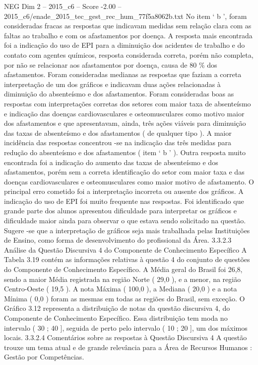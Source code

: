 \begin{textsample}{NEG Dim 2 – 2015\_c6 – Score -2.00 – 2015\_c6/enade\_2015\_tec\_gest\_rec\_hum\_77f5a8062b.txt}
No item ‘ b ’, foram consideradas fracas as respostas que indicavam medidas sem relação clara com as faltas ao trabalho e com os afastamentos por doença.
A resposta mais encontrada foi a indicação do uso de EPI para a diminuição dos acidentes de trabalho e do contato com agentes químicos, resposta considerada correta, porém não completa, por não se relacionar aos afastamentos por doença, causa de 80 \% dos afastamentos.
Foram consideradas medianas as respostas que faziam a correta interpretação de um dos gráficos e indicavam duas ações relacionadas à diminuição do absenteísmo e dos afastamentos.
Foram consideradas boas as respostas com interpretações corretas dos setores com maior taxa de absenteísmo e indicação das doenças cardiovasculares e osteomusculares como motivo maior dos afastamentos e que apresentavam, ainda, três ações viáveis para diminuição das taxas de absenteísmo e dos afastamentos ( de qualquer tipo ).
A maior incidência das respostas concentrou -se na indicação das três medidas para redução do absenteísmo e dos afastamentos ( item ‘ b ’ ).
Outra resposta muito encontrada foi a indicação do aumento das taxas de absenteísmo e dos afastamentos, porém sem a correta identificação do setor com maior taxa e das doenças cardiovasculares e osteomusculares como maior motivo de afastamento.
O principal erro cometido foi a interpretação incorreta ou ausente dos gráficos.
A indicação do uso de EPI foi muito frequente nas respostas.
Foi identificado que grande parte dos alunos apresentou dificuldade para interpretar os gráficos e dificuldade maior ainda para observar o que estava sendo solicitado na questão.
Sugere -se que a interpretação de gráficos seja mais trabalhada pelas Instituições de Ensino, como forma de desenvolvimento do profissional da Área. 3.3.2.3 Análise da Questão Discursiva 4 do Componente de Conhecimento Específico A Tabela 3.19 contém as informações relativas à questão 4 do conjunto de questões do Componente de Conhecimento Específico.
A Média geral do Brasil foi 26,8, sendo a maior Média registrada na região Norte ( 29,0 ), e a menor, na região Centro-Oeste ( 19,5 ).
A nota Máxima ( 100,0 ), a Mediana ( 20,0 ) e a nota Mínima ( 0,0 ) foram as mesmas em todas as regiões do Brasil, sem exceção.
O Gráfico 3.12 representa a distribuição de notas da questão discursiva 4, do Componente de Conhecimento Específico.
Essa distribuição tem moda no intervalo ( 30 ; 40 ], seguida de perto pelo intervalo ( 10 ; 20 ], um dos máximos locais. 3.3.2.4 Comentários sobre as respostas à Questão Discursiva 4 A questão trouxe um tema atual e de grande relevância para a Área de Recursos Humanos : Gestão por Competências.

\end{textsample}
